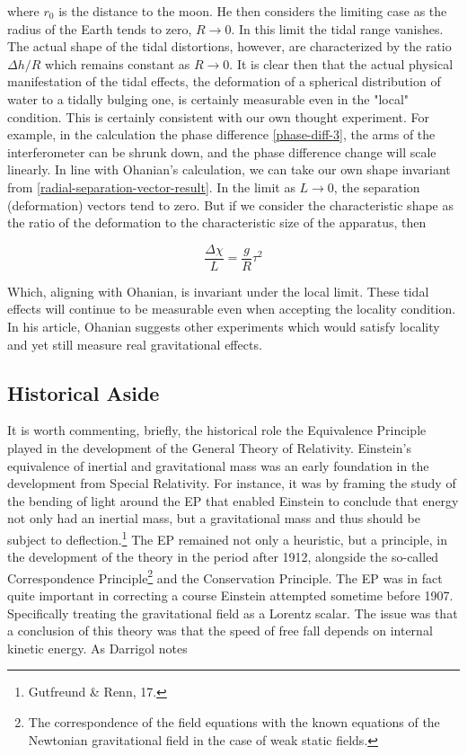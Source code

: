 \documentclass[11pt]{article}
\begin{document}
where $r_0$ is the distance to the moon. He then considers the limiting case as the radius of the Earth tends to zero, $R \rightarrow 0$. In this limit the tidal range vanishes. The actual shape of the tidal distortions, however, are characterized by the ratio $\Delta h / R$ which remains constant as $R \rightarrow 0$. It is clear then that the actual physical manifestation of the tidal effects, the deformation of a spherical distribution of water to a tidally bulging one, is certainly measurable even in the "local" condition. This is certainly consistent with our own thought experiment. For example, in the calculation the phase difference \eqref{phase-diff-3}, the arms of the interferometer can be shrunk down, and the phase difference change will scale linearly. In line with Ohanian's calculation, we can take our own shape invariant from \eqref{radial-separation-vector-result}. In the limit as $L \rightarrow 0$, the separation (deformation) vectors tend to zero. But if we consider the characteristic shape as the ratio of the deformation to the characteristic size of the apparatus, then

\begin{equation}
    \label{char-tidal-shape-2}
    \frac{\Delta \chi}{L} = \frac{g}{R} \tau^2
\end{equation}

Which, aligning with Ohanian, is invariant under the local limit. These tidal effects will continue to be measurable even when accepting the locality condition. In his article, Ohanian suggests other experiments which would satisfy locality and yet still measure real gravitational effects.

\subsection{Historical Aside}

It is worth commenting, briefly, the historical role the Equivalence Principle played in the development of the General Theory of Relativity. Einstein's equivalence of inertial and gravitational mass was an early foundation in the development from Special Relativity. For instance, it was by framing the study of the bending of light around the EP that enabled Einstein to conclude that energy not only had an inertial mass, but a gravitational mass and thus should be subject to deflection.\footnote{Gutfreund \& Renn, 17.} The EP remained not only a heuristic, but a principle, in the development of the theory in the period after 1912, alongside the so-called Correspondence Principle\footnote{The correspondence of the field equations with the known equations of the Newtonian gravitational field in the case of weak static fields.} and the Conservation Principle. The EP was in fact quite important in correcting a course Einstein attempted sometime before 1907. Specifically treating the gravitational field as a Lorentz scalar. The issue was that a conclusion of this theory was that the speed of free fall depends on internal kinetic energy. As Darrigol notes
\end{document}
